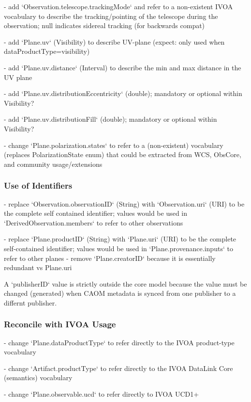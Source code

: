\documentclass[11pt,a4paper]{ivoa}
\begin{document}
- add `Observation.telescope.trackingMode` and refer to a non-existent IVOA vocabulary to describe the 
  tracking/pointing of the telescope during the observation; null indicates sidereal tracking (for backwards compat)

- add `Plane.uv` (Visibility) to describe UV-plane (expect: only used when dataProductType=visibility)

- add `Plane.uv.distance` (Interval) to describe the min and max distance in the UV plane

- add `Plane.uv.distributionEccentricity` (double); mandatory or optional within Visibility?

- add `Plane.uv.distributionFill` (double); mandatory or optional within Visibility?

- change `Plane.polarization.states` to refer to a (non-existent) vocabulary (replaces PolarizationState enum) that could be extracted from WCS, ObsCore, and community usage/extensions

\subsubsection{Use of Identifiers}

- replace `Observation.observationID` (String) with `Observation.uri` (URI) to be the complete self contained identifier; values would be used in `DerivedObservation.members` to refer to other observations
  
- replace `Plane.productID` (String) with `Plane.uri` (URI) to be the complete self-contained identifier; values would be used in `Plane.provenance.inputs` to refer to other planes
- remove `Plane.creatorID` because it is essentially redundant vs Plane.uri

A `publisherID` value is strictly outside the core model because the value must be changed (generated) when CAOM metadata is synced from one publisher to a differnt publisher.

\subsubsection{Reconcile with IVOA Usage}

- change `Plane.dataProductType` to refer directly to the IVOA product-type vocabulary

- change `Artifact.productType` to refer directly to the IVOA DataLink Core (semantics) vocabulary

- change `Plane.observable.ucd` to refer directly to IVOA UCD1+
\end{document}
